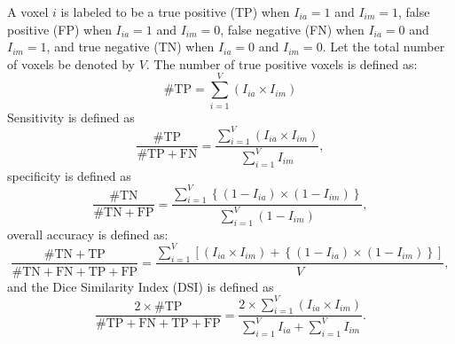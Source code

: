 \documentclass{elsarticle}\usepackage[]{graphicx}\usepackage[]{color}
\begin{document}
A voxel $i$ is labeled to be a true positive (TP) when $I_{ia} = 1$ and $I_{im} = 1$, false positive (FP) when $I_{ia} = 1$ and $I_{im} = 0$, false negative (FN) when $I_{ia} = 0$ and $I_{im} = 1$, and true negative (TN) when $I_{ia} = 0$ and $I_{im} = 0$.  Let the total number of voxels be denoted by $V$.  The number of true positive voxels is defined as: 
$$
\# \text{TP} = \sum_{i=1}^{V} \left( I_{ia} \times I_{im}\right)
$$
Sensitivity is defined as
$$
\frac{\# \text{TP} }{\# \text{TP} + \text{FN}} = \frac{ \sum_{i=1}^{V} \left( I_{ia} \times I_{im}\right) }{ \sum_{i=1}^{V} I_{im}},
$$
specificity is defined as
$$
\frac{\# \text{TN} }{\# \text{TN} + \text{FP}} = \frac{ \sum_{i=1}^{V} \left\{ (1-I_{ia}) \times (1- I_{im} ) \right\} }{ \sum_{i=1}^{V} (1 - I_{im} )},
$$
overall accuracy is defined as:
$$
\frac{\# \text{TN} + \text{TP} }{\# \text{TN} + \text{FN} + \text{TP} + \text{FP}} = \frac{ \sum_{i=1}^{V} \left[ (I_{ia} \times I_{im}) + \left\{ (1-I_{ia}) \times (1- I_{im} ) \right\} \right] }{ V },
$$
and the Dice Similarity Index (DSI) is defined as
$$
\frac{2 \times \#\text{TP} }{ \# \text{TP} + \text{FN} + \text{TP} + \text{FP}} = \frac{ 2 \times \sum_{i=1}^{V} \left( I_{ia} \times I_{im}\right) }{\sum_{i=1}^{V} I_{ia}  + \sum_{i=1}^{V} I_{im}}.
$$
\end{document}
